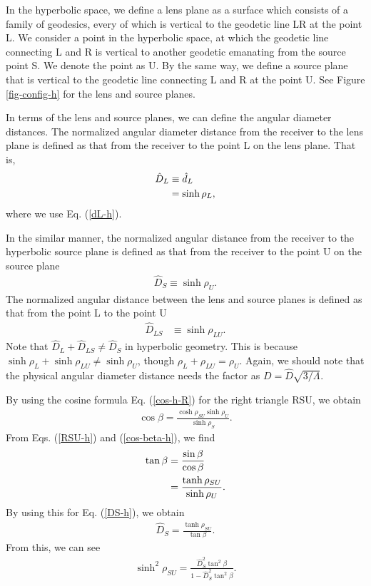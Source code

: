 \documentclass[twocolumn,showpacs,preprintnumbers,amsmath,amssymb]{revtex4-1}
\begin{document}
In the hyperbolic space, we define a lens plane as a surface which consists of 
a family of geodesics, every of which is vertical to the geodetic line LR 
at the point L. 
We consider a point in the hyperbolic space, 
at which the geodetic line connecting L and R is vertical 
to another geodetic emanating from the source point S. 
We denote the point as U. 
By the same way, we define a source plane that is vertical to 
the geodetic line connecting L and R at the point U.  
See Figure \ref{fig-config-h} for the lens and source planes. 

In terms of the lens and source planes, 
we can define the angular diameter distances. 
The normalized angular diameter distance from the receiver to the lens plane 
is defined as that from the receiver to the point L on the lens plane. 
That is,  
\begin{align}
\hat D_L 
&\equiv 
\hat d_L 
\notag\\
&= \sinh\rho_L , 
\label{DL-h}
\end{align}
where we use Eq. (\ref{dL-h}). 

In the similar manner, 
the normalized angular distance from the receiver to the hyperbolic source plane 
is defined as that from the receiver to the point U on the source plane 
\begin{align}
\hat D_S 
\equiv 
\sinh\rho_U . 
\label{DS-h}
\end{align} 
The normalized angular distance between the lens and source planes  
is defined as that from the point L to the point U 
\begin{align}
\hat D_{LS} 
&\equiv 
\sinh\rho_{LU} .
\label{DLS-h}
\end{align}
Note that $\hat D_L + \hat D_{LS} \neq \hat D_S$ in hyperbolic geometry. 
This is because 
$\sinh\rho_L + \sinh\rho_{LU} \neq \sinh\rho_U$, 
though $\rho_L + \rho_{LU} = \rho_U$. 
Again, we should note that 
the physical angular diameter distance needs the factor as 
$D = \hat D \sqrt{3/\Lambda}$.  



By using the cosine formula Eq. (\ref{cos-h-R}) 
for the right triangle RSU, 
we obtain 
\begin{align}
\cos\beta 
= 
\frac{\cosh \rho_{SU}\sinh\rho_U}{\sinh\rho_S} .
\label{cos-beta-h}
\end{align}
From Eqs. (\ref{RSU-h}) and (\ref{cos-beta-h}), 
we find 
\begin{align}
\tan\beta 
&=
\frac{\sin\beta}{\cos\beta}
\notag\\
&=
\frac{\tanh\rho_{SU}}{\sinh\rho_U} . 
\label{tanbeta-h}
\end{align}
By using this for Eq. (\ref{DS-h}), we obtain 
\begin{align}
\hat D_S 
= 
\frac{\tanh\rho_{SU}}{\tan\beta} .
\end{align}
From this, we can see 
\begin{align}
\sinh^2\rho_{SU} 
=
\frac{\hat D_S^2 \tan^2\beta}{1 - \hat D_S^2 \tan^2\beta} . 
\label{sinh2SU-h}
\end{align}
\end{document}
